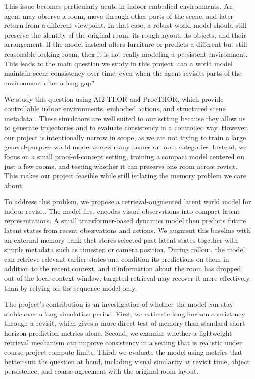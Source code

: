 \documentclass[10pt,twocolumn,letterpaper]{article}
\begin{document}
This issue becomes particularly acute in indoor embodied environments. An agent
may observe a room, move through other parts of the scene, and later return from
a different viewpoint. In that case, a robust world model should still preserve
the identity of the original room: its rough layout, its objects, and their
arrangement. If the model instead alters furniture or predicts a different but
still reasonable-looking room, then it is not really modeling a persistent
environment. This leads to the main question we study in this project: can a
world model maintain scene consistency over time, even when the agent revisits
parts of the environment after a long gap?

We study this question using AI2-THOR and ProcTHOR, which provide controllable
indoor environments, embodied actions, and structured scene metadata
\cite{kolve2017ai2thor,deitke2022procthor}. These simulators are well suited to
our setting because they allow us to generate trajectories and to evaluate
consistency in a controlled way. However, our project is intentionally narrow in
scope, as we are not trying to train a large general-purpose world model across
many homes or room categories. Instead, we focus on a small proof-of-concept
setting, training a compact model centered on just a few rooms, and testing
whether it can preserve one room across revisit. This makes our project feasible
while still isolating the memory problem we care about.

To address this problem, we propose a retrieval-augmented latent world model for
indoor revisit. The model first encodes visual observations into compact latent
representations. A small transformer-based dynamics model then predicts future
latent states from recent observations and actions. We augment this baseline
with an external memory bank that stores selected past latent states together
with simple metadata such as timestep or camera position. During rollout, the
model can retrieve relevant earlier states and condition its predictions on them
in addition to the recent context, and if information about the room has dropped
out of the local context window, targeted retrieval may recover it more
effectively than by relying on the sequence model only.

The project’s contribution is an investigation of whether the model can stay
stable over a long simulation period. First, we estimate long-horizon consistency
through a revisit, which gives a more direct test of memory than standard
short-horizon prediction metrics alone. Second, we examine whether a lightweight
retrieval mechanism can improve consistency in a setting that is realistic under
course-project compute limits. Third, we evaluate the model using metrics that
better suit the question at hand, including visual similarity at revisit time,
object persistence, and coarse agreement with the original room layout.
\end{document}
